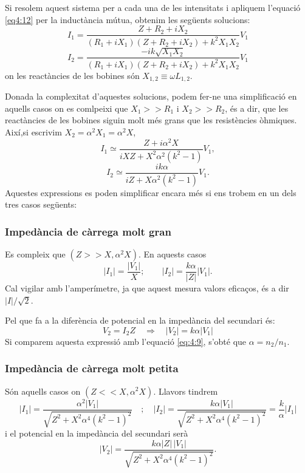 \documentclass[a4paper,10.5pt]{report}
\begin{document}
Si resolem aquest sistema per a cada una de les intensitats i apliquem l'equació \eqref{eq4:12} per la inductància mútua, obtenim les següents solucions:
\begin{equation}
	I_1 = \frac{Z + R_2 + iX_2}{(R_1 + iX_1)(Z + R_2 + iX_2) + k^2 X_1 X_2} V_1 \label{eq4:15}
\end{equation}
\begin{equation}
	I_2 = \frac{-ik\sqrt{X_1 X_2}}{(R_1 + iX_1)(Z + R_2 + iX_2) + k^2 X_1 X_2} V_1 \label{eq4:16}
\end{equation}
on les reactàncies de les bobines són $X_{1,2} \equiv \omega L_{1,2}$.

Donada la complexitat d'aquestes solucions, podem fer-ne una simplificació en aquells casos on es comlpeixi que $X_1 >> R_1$ i $X_2 >> R_2$, és a dir, que les reactàncies de les bobines siguin molt més grans que les resistències òhmiques. Així,si escrivim $X_2 = \alpha^2 X_1 = \alpha^2 X$,
\begin{equation}
	I_1 \simeq \frac{Z + i\alpha^2 X}{iX Z + X^2 \alpha^2 (k^2 - 1)} V_1, \label{eq4:17}
\end{equation}
\begin{equation}
	I_2 \simeq \frac{i k \alpha}{iZ + X \alpha^2 (k^2 - 1)} V_1. \label{eq4:18}
\end{equation}
Aquestes expressions es poden simplificar encara més si ens trobem en un dels tres casos següents:
\subsubsection{Impedància de càrrega molt gran}
Es compleix que $(Z >> X,\alpha^2X)$. En aquests casos
\begin{equation}
	|I_1| =  \frac{|V_1|}{X}  ; \qquad |I_2| = \frac{k \alpha}{|Z|} |V_1|.
	\label{eq4:19}
\end{equation}
Cal vigilar amb l'amperímetre, ja que aquest mesura valors eficaços, és a dir $|I|/\sqrt{2}$.

Pel que fa a la diferència de potencial en la impedància del secundari és:
\begin{equation}
	V_2 = I_2 Z \quad \Longrightarrow \quad |V_2| = k \alpha |V_1|
	\label{eq4:20}
\end{equation}
Si comparem aquesta expressió amb l'equació \eqref{eq:4:9}, s'obté que $\alpha = n_2/n_1$.
\subsubsection{Impedància de càrrega molt petita}
Són aquells casos on $(Z << X,\alpha^2X)$. Llavors tindrem
\begin{equation}
	|I_1| = \frac{\alpha^2 |V_1|}{\sqrt{Z^2 + X^2 \alpha^4 (k^2 - 1)^2}} \quad ; \quad
	|I_2| = \frac{k \alpha |V_1|}{\sqrt{Z^2 + X^2 \alpha^4 (k^2 - 1)^2}} = \frac{k}{\alpha} |I_1|
	\label{eq4:21}
\end{equation}
i el potencial en la impedància del secundari serà
\begin{equation}
	|V_2| = \frac{k \alpha |Z| \, |V_1|}{\sqrt{Z^2 + X^2 \alpha^4 (k^2 - 1)^2}}.
	\label{eq4:22}
\end{equation}
\end{document}
